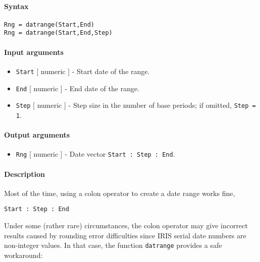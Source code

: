 


	\paragraph{Syntax}

\begin{verbatim}
Rng = datrange(Start,End)
Rng = datrange(Start,End,Step)
\end{verbatim}

\paragraph{Input arguments}

\begin{itemize}
\item
  \texttt{Start} {[} numeric {]} - Start date of the range.
\item
  \texttt{End} {[} numeric {]} - End date of the range.
\item
  \texttt{Step} {[} numeric {]} - Step size in the number of base
  periods; if omitted, \texttt{Step = 1}.
\end{itemize}

\paragraph{Output arguments}

\begin{itemize}
\itemsep1pt\parskip0pt
\item
  \texttt{Rng} {[} numeric {]} - Date vector
  \texttt{Start : Step : End}.
\end{itemize}

\paragraph{Description}

Most of the time, using a colon operator to create a date range works
fine,

\begin{verbatim}
Start : Step : End
\end{verbatim}

Under some (rather rare) circumstances, the colon operator may give
incorrect results caused by rounding error difficulties since IRIS
serial date numbers are non-integer values. In that case, the function
\texttt{datrange} provides a safe workaround:

